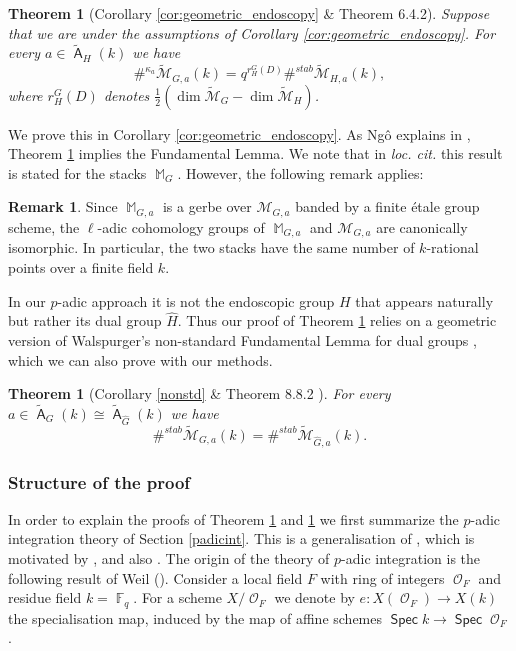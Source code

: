 \documentclass{article}
\DeclareMathOperator{\A}{\mathsf{A}}
\DeclareMathOperator{\Fb}{\mathbb{F}}
\DeclareMathOperator{\Mb}{\mathbb{M}}
\newcommand{\Mc}{\mathcal{M}}
\DeclareMathOperator{\Spec}{\mathsf{Spec}}
\DeclareMathOperator{\Oo}{\mathcal{O}}
\newcommand{\FA}{\A}
\theoremstyle{definition}
\newtheorem{rmk}[definition]{Remark}
\theoremstyle{plain}
\newtheorem{theorem}[definition]{Theorem}
\begin{document}
\begin{theorem}[Corollary \ref{cor:geometric_endoscopy} \& \cite{MR2653248} Theorem 6.4.2]\label{gmst} Suppose that we are under the assumptions of Corollary \ref{cor:geometric_endoscopy}. For every $a \in \widetilde{\FA}_H(k)$ we have 
\[\#^{\kappa_a} \widetilde{\Mc}_{G,a}(k) = q^{r_H^G(D)}\#^{stab} \widetilde{\Mc}_{H,a}(k), \]
where $r_H^G(D)$ denotes $\frac{1}{2}(\dim \widetilde{\Mc}_{G} - \dim \widetilde{\Mc}_{H})$.
\end{theorem}

We prove this in Corollary \ref{cor:geometric_endoscopy}. As Ng\^o explains in \cite[Section 8]{MR2653248}, Theorem \ref{gmst} implies the Fundamental Lemma. We note that in \emph{loc. cit.} this result is stated for the stacks $\Mb_G$. However, the following remark applies:

 \begin{rmk}\label{rmk:cohomology}
 Since $\Mb_{G,a}$ is a gerbe over $\Mc_{G,a}$ banded by a finite \'etale group scheme, the $\ell$-adic cohomology groups of $\Mb_{G,a}$ and $\Mc_{G,a}$ are canonically isomorphic. In particular, the two stacks have the same number of $k$-rational points over a finite field $k$.
 \end{rmk}

In our $p$-adic approach it is not the endoscopic group $H$ that appears naturally but rather its dual group $\widehat{H}$. Thus our proof of Theorem \ref{gmst} relies on a geometric version of Walspurger's non-standard Fundamental Lemma for dual groups \cite{Wa08}, which we can also prove with our methods.

\begin{theorem}[Corollary \ref{nonstd} \& \cite{MR2653248} Theorem 8.8.2 ]\label{walem} For every $a \in \widetilde{\FA}_G(k) \cong \widetilde{\FA}_{\widehat{G}}(k)$ we have
\[ \#^{stab} \widetilde{\Mc}_{G,a}(k)= \#^{stab} \widetilde{\Mc}_{\widehat{G},a}(k).\]
\end{theorem}


\subsubsection*{Structure of the proof}

In order to explain the proofs of Theorem \ref{gmst} and \ref{walem} we first summarize the $p$-adic integration theory of Section \ref{padicint}. This is a generalisation of \cite[Appendix A]{gwz}, which is motivated by \cite{Ba99,DL2002}, and also \cite{Ya06}. The origin of the theory of $p$-adic integration is the following result of Weil (\cite[Theorem 2.2.5]{weil2012adeles}). Consider a local field $F$ with ring of integers $\Oo_F$ and residue field $k = \Fb_q$. For a scheme $X/\Oo_F$ we denote by $e\colon X(\Oo_F) \to X(k)$ the specialisation map, induced by the map of affine schemes $\Spec k \to \Spec \Oo_F$.
\end{document}
